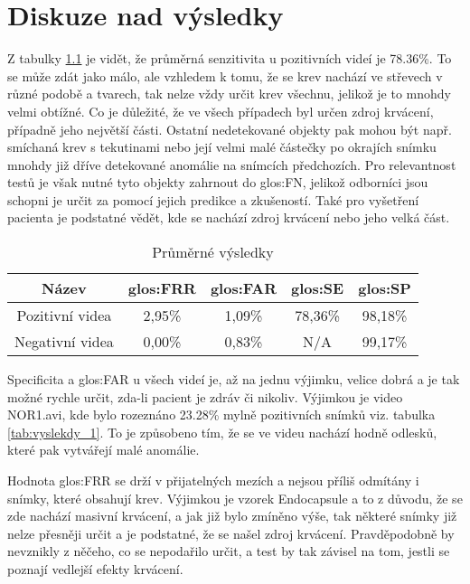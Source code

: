 \chapter{Diskuze nad výsledky}
Z tabulky \ref{tab:avgres} je vidět, že průměrná senzitivita u pozitivních videí je 78.36\%. To se může zdát jako málo, ale vzhledem k tomu, že se krev nachází ve střevech v různé podobě a tvarech, tak nelze vždy určit krev všechnu, jelikož je to mnohdy velmi obtížné. Co je důležité, že ve všech případech byl určen zdroj krvácení, případně jeho největší části. Ostatní nedetekované objekty pak mohou být např. smíchaná krev s tekutinami nebo její velmi malé částečky po okrajích snímku mnohdy již dříve detekované anomálie na snímcích předchozích. Pro relevantnost testů je však nutné tyto objekty zahrnout do \gls{glos:FN}, jelikož odborníci jsou schopni je určit za pomocí jejich predikce a zkušeností. Také pro vyšetření pacienta je podstatné vědět, kde se nachází zdroj krvácení nebo jeho velká část.

\begin{table}[h]
	\centering
	\begin{tabular}{|c|c|c|c|c|}
		\hline
		\bf Název &  \bf \gls{glos:FRR} & \bf \gls{glos:FAR} & \bf \gls{glos:SE} & \bf \gls{glos:SP} \\ \hline
		Pozitivní videa & 2,95\% & 1,09\% & 78,36\% & 98,18\% \\ \hline
		Negativní videa & 0,00\% & 0,83\% & N/A & 99,17\% \\ \hline
	\end{tabular}
	\caption{Průměrné výsledky}
	\label{tab:avgres}
\end{table}

Specificita a \gls{glos:FAR} u všech videí je, až na jednu výjimku, velice dobrá a je tak možné rychle určit, zda-li pacient je zdráv či nikoliv. Výjimkou je video NOR1.avi, kde bylo rozeznáno 23.28\% mylně pozitivních snímků viz. tabulka \ref{tab:vyslekdy_1}. To je způsobeno tím, že se ve videu nachází hodně odlesků, které pak vytvářejí malé anomálie.

Hodnota \gls{glos:FRR} se drží v přijatelných mezích a nejsou příliš odmítány i snímky, které obsahují krev. Výjimkou je vzorek Endocapsule a to z důvodu, že se zde nachází masivní krvácení, a jak již bylo zmíněno výše, tak některé snímky již nelze přesněji určit a je podstatné, že se našel zdroj krvácení. Pravděpodobně by nevznikly z něčeho, co se nepodařilo určit, a test by tak závisel na tom, jestli se poznají vedlejší efekty krvácení.

